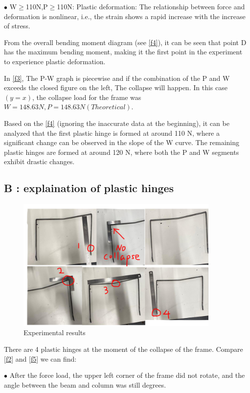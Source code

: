 $\bullet$ W$\geq$110N,P$\geq$110N: Plastic deformation: The relationship between force and deformation is nonlinear, i.e., the strain shows a rapid increase with the increase of stress.

From the overall bending moment diagram (see \autoref{f4}), it can be seen that point D has the maximum bending moment, making it the first point in the experiment to experience plastic deformation.

In \autoref{f3}, The P-W graph is piecewise and if the combination of the P and W exceeds the closed figure on the left, The collapse will happen. In this case$(y=x)$, the collapse load for the frame was $W=148.63N,P=148.63N(Theoretical)$.

Based on the \autoref{f4} (ignoring the inaccurate data at the beginning), it can be analyzed that the first plastic hinge is formed at around 110 N, where a significant change can be observed in the slope of the W curve. The remaining plastic hinges are formed at around 120 N, where both the P and W segments exhibit drastic changes.



\subsection*{B : explaination of plastic hinges}

\begin{figure}[htbp]
    \centering
    \includegraphics[width=10cm]{./fig/18.jpg}
    \caption{Experimental results}
    \label{f5}
\end{figure}

There are 4 plastic hinges at the moment of the collapse of the frame. Compare \autoref{f2} and \autoref{f5} we can find: 

$\bullet$ After the force load, the upper left corner of the frame did not rotate, and the angle between the beam and column was still degrees.

